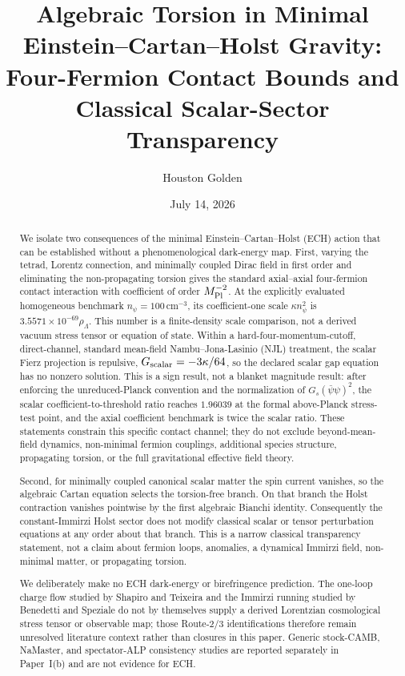 \documentclass[aps,prd,twocolumn,superscriptaddress,showpacs,preprintnumbers,nofootinbib,longbibliography,floatfix]{revtex4-2}
\newcommand{\paperTimestamp}{July 14, 2026}
\begin{document}

\title{Algebraic Torsion in Minimal Einstein--Cartan--Holst Gravity:\\
Four-Fermion Contact Bounds and Classical Scalar-Sector Transparency}

\author{Houston Golden}

\date{\paperTimestamp}

\begin{abstract}
We isolate two consequences of the minimal Einstein--Cartan--Holst (ECH)
action that can be established without a phenomenological dark-energy map.
First, varying the tetrad, Lorentz connection, and minimally coupled Dirac
field in first order and eliminating the non-propagating torsion gives the
standard axial--axial four-fermion contact interaction with coefficient of
order $M_{\rm Pl}^{-2}$.  At the explicitly evaluated homogeneous benchmark
$n_\psi=100\,\mathrm{cm}^{-3}$, its coefficient-one scale
$\kappa n_\psi^2$ is $3.5571\times10^{-69}\rho_\Lambda$.  This number is a
finite-density scale comparison, not a derived vacuum stress tensor or
equation of state.  Within a
hard-four-momentum-cutoff, direct-channel, standard mean-field
Nambu--Jona-Lasinio (NJL) treatment, the scalar Fierz projection is repulsive,
$G_{\rm scalar}=-3\kappa/64$, so the declared scalar gap equation has no
nonzero solution.  This is a sign result, not a blanket magnitude result:
after enforcing the unreduced-Planck convention and the normalization of
$G_s(\bar\psi\psi)^2$, the scalar coefficient-to-threshold ratio reaches
$1.96039$ at the formal above-Planck stress-test point, and the axial
coefficient benchmark is twice the scalar ratio.  These statements constrain
this specific contact channel; they do not exclude beyond-mean-field dynamics,
non-minimal fermion couplings, additional species structure, propagating
torsion, or the full gravitational effective field theory.

Second, for minimally coupled canonical scalar matter the spin current
vanishes, so the algebraic Cartan equation selects the torsion-free branch.
On that branch the Holst contraction vanishes pointwise by the first
algebraic Bianchi identity.  Consequently the constant-Immirzi Holst sector
does not modify classical scalar or tensor perturbation equations at any
order about that branch.  This is a narrow classical transparency statement,
not a claim about fermion loops, anomalies, a dynamical Immirzi field,
non-minimal matter, or propagating torsion.

We deliberately make no ECH dark-energy or birefringence prediction.  The
one-loop charge flow studied by Shapiro and Teixeira and the Immirzi running
studied by Benedetti and Speziale do not by themselves supply a derived
Lorentzian cosmological stress tensor or observable map; those Route-2/3
identifications therefore remain unresolved literature context rather than
closures in this paper.  Generic stock-CAMB, NaMaster, and spectator-ALP
consistency studies are reported separately in Paper~I(b) and are not evidence
for ECH.
\end{abstract}
\end{document}
